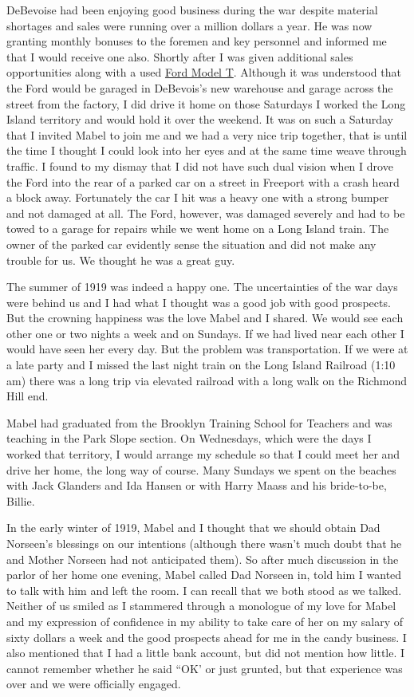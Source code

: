 \documentclass[12pt]{book}              %
\begin{document}
DeBevoise had been enjoying good business during the war despite material shortages and sales were running over a million dollars a year. He was now granting monthly bonuses to the foremen and key personnel and informed me that I would receive one also. Shortly after I was given additional sales opportunities along with a used \href{http://en.wikipedia.org/wiki/Ford_Model_T}{Ford Model T}. Although it was understood that the Ford would be garaged in DeBevois's new warehouse and garage across the street from the factory, I did drive it home on those Saturdays I worked the Long Island territory and would hold it over the weekend. It was on such a Saturday that I invited Mabel to join me and we had a very nice trip together, that is until the time I thought I could look into her eyes and at the same time weave through traffic. I found to my dismay that I did not have such dual vision when I drove the Ford into the rear of a parked car on a street in Freeport with a crash heard a block away. Fortunately the car I hit was a heavy one with a strong bumper and not damaged at all. The Ford, however, was damaged severely and had to be towed to a garage for repairs while we went home on a Long Island train. The owner of the parked car evidently sense the situation and did not make any trouble for us. We thought he was a great guy. 


The summer of 1919 was indeed a happy one. The uncertainties of the war days were behind us and I had what I thought was a good job with good prospects. But the crowning happiness was the love Mabel and I shared. We would see each other one or two nights a week and on Sundays. If we had lived near each other I would have seen her every day. But the problem was transportation. If we were at a late party and I missed the last night train on the Long Island Railroad (1:10 am) there was a long trip via elevated railroad with a long walk on the Richmond Hill end. 

Mabel had graduated from the Brooklyn Training School for Teachers and was teaching in the Park Slope section. On Wednesdays, which were the days I worked that territory, I would arrange my schedule so that I could meet her and drive her home, the long way of course. Many Sundays we spent on the beaches with Jack Glanders and Ida Hansen or with Harry Maass and his bride-to-be, Billie. 

In the early winter of 1919, Mabel and I thought that we should obtain Dad Norseen's blessings on our intentions (although there wasn't much doubt that he and Mother Norseen had not anticipated them). So after much discussion in the parlor of her home one evening, Mabel called Dad Norseen in, told him I wanted to talk with him and left the room. I can recall that we both stood as we talked. Neither of us smiled as I stammered through a monologue of my love for Mabel and my expression of confidence in my ability to take care of her on my salary of sixty dollars a week and the good prospects ahead for me in the candy business. I also mentioned that I had a little bank account, but did not mention how little. I cannot remember whether he said ``OK' or just grunted, but that experience was over and we were officially engaged. 
\end{document}
